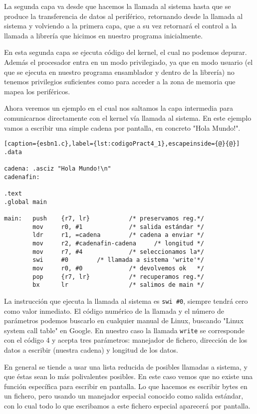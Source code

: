 La segunda capa va desde que hacemos la llamada al sistema hasta que se
produce la transferencia de datos al periférico, retornando desde la llamada
al sistema y volviendo a la primera capa, que a su vez retornará el control
a la llamada a librería que hicimos en nuestro programa inicialmente.

En esta segunda capa se ejecuta código del kernel, el cual no podemos depurar.
Además el procesador entra en un modo privilegiado, ya que en modo usuario (el
que se ejecuta en nuestro programa ensamblador y dentro de la librería) no
tenemos privilegios suficientes como para acceder a la zona de memoria que
mapea los periféricos.

Ahora veremos un ejemplo en el cual nos saltamos la capa intermedia para
comunicarnos directamente con el kernel vía llamada al sistema. En este ejemplo
vamos a escribir una simple cadena por pantalla, en concreto "Hola Mundo!".

\begin{lstlisting}[caption={esbn1.c},label={lst:codigoPract4_1},escapeinside={@}{@}]
.data

cadena: .asciz "Hola Mundo!\n"
cadenafin:

.text
.global main
 
main:   push    {r7, lr}           /* preservamos reg.*/
        mov     r0, #1             /* salida estándar */
        ldr     r1, =cadena        /* cadena a enviar */
        mov     r2, #cadenafin-cadena     /* longitud */
        mov     r7, #4             /* seleccionamos la*/
        swi     #0        /* llamada a sistema 'write'*/
        mov     r0, #0             /* devolvemos ok   */
        pop     {r7, lr}           /* recuperamos reg.*/
        bx      lr                 /* salimos de main */
\end{lstlisting}

La instrucción que ejecuta la llamada al sistema es {\tt swi \#0},
siempre tendrá cero como valor inmediato. El código numérico de
la llamada y el número de parámetros podemos buscarlo en cualquier
manual de Linux, buscando "Linux system call table" en Google. En
nuestro caso la llamada {\tt write} se corresponde con el código
4 y acepta tres parámetros: manejador de fichero, dirección de
los datos a escribir (nuestra cadena) y longitud de los datos.

En general se tiende a usar una lista reducida de posibles llamadas
a sistema, y que éstas sean lo más polivalentes posibles. En este
caso vemos que no existe una función específica para escribir en
pantalla. Lo que hacemos es escribir bytes en un fichero, pero usando
un manejador especial conocido como salida estándar, con lo cual todo
lo que escribamos a este fichero especial aparecerá por pantalla.

